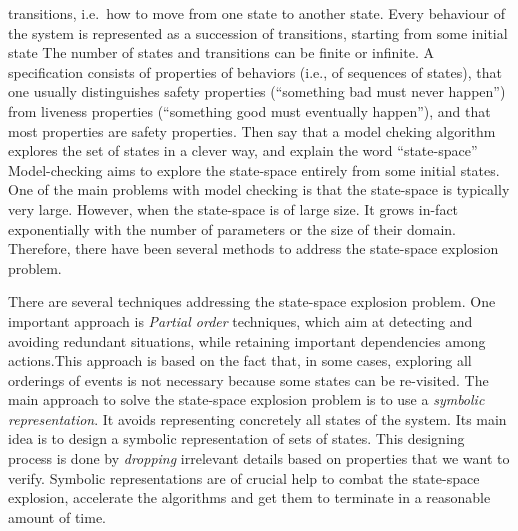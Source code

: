 transitions, i.e.\ how to move from one state to another state. Every behaviour of the system is represented as a succession of transitions, starting from some initial state
The number of states and transitions can be finite or infinite.
A specification consists of properties of behaviors (i.e., of sequences of states), that one usually distinguishes safety properties (``something bad must never happen'') from liveness properties (``something good must eventually happen''), and
  that most properties are safety properties. Then say that a model cheking algorithm explores the set of states in a clever way, and explain the word ``state-space''
Model-checking aims to explore the state-space entirely from some initial states.
One of the main problems with model checking is that the state-space is typically very
  large. However, when the state-space is of large size. It grows in-fact
exponentially with the number of parameters or the size of their
domain. Therefore, there have been several methods to address the
state-space explosion problem.

                   
There are several techniques addressing the state-space explosion problem.
One important approach is \emph{Partial order} techniques, which aim at detecting and avoiding
redundant situations, while retaining important dependencies among
actions.This approach is based on the fact that, in some cases, exploring all orderings of events is not necessary because some states can be re-visited.  The main approach to solve the state-space explosion problem is to use a
\emph{symbolic
  representation}. It avoids
   representing concretely all states of the system. 
Its main idea is to design a symbolic representation of sets of states.
This designing process is done by \emph{dropping} irrelevant details based on properties that we want to verify. Symbolic representations are of crucial help to combat the state-space explosion, accelerate the algorithms and get them to terminate in a reasonable amount of time.

